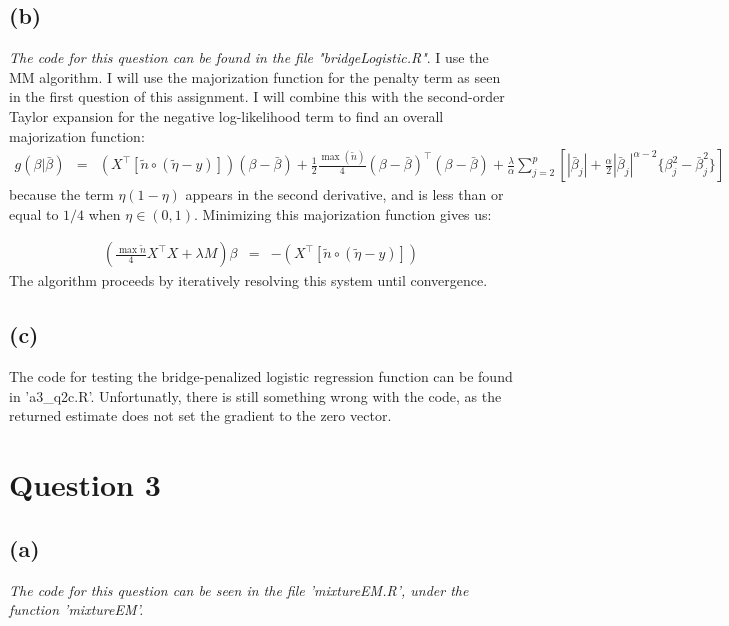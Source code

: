 \documentclass{article}\usepackage[]{graphicx}\usepackage[]{color}
\begin{document}
\subsection*{(b)}
\emph{The code for this question can be found in the file "bridgeLogistic.R"}.  I use the MM algorithm.  I will use the majorization function for the penalty term as seen in the first question of this assignment.  I will combine this with the second-order Taylor expansion for the negative log-likelihood term to find an overall majorization function:
\begin{eqnarray*}
 g(\beta|\bar{\beta}) &=& \left( X^\top[\tilde{n}\circ(\tilde{\eta}-y)] \right)(\beta-\bar{\beta}) + \frac{1}{2}\frac{\max(\tilde{n})}{4}(\beta-\bar{\beta})^\top(\beta-\bar{\beta}) + \frac{\lambda}{\alpha} \sum_{j=2}^p \left[|\bar{\beta}_j| + \frac{\alpha}{2}|\bar{\beta}_j|^{\alpha-2}\{\beta_j^2 - \bar{\beta}_j^2\} \right]
\end{eqnarray*}
because the term $\eta(1-\eta)$ appears in the second derivative, and is less than or equal to $1/4$ when $\eta \in (0,1)$.  Minimizing this majorization function gives us:

\begin{eqnarray*}
 \left(\frac{\max{\tilde{n}}}{4}X^\top X + \lambda M\right)\beta &=& - \left( X^\top[\tilde{n}\circ(\tilde{\eta}-y)] \right)
\end{eqnarray*}
The algorithm proceeds by iteratively resolving this system until convergence.

\subsection*{(c)}
The code for testing the bridge-penalized logistic regression function can be found in 'a3\_q2c.R'.  Unfortunatly, there is still something wrong with the code, as the returned estimate does not set the gradient to the zero vector.

\section*{Question 3}
\subsection*{(a)}
\emph{The code for this question can be seen in the file 'mixtureEM.R', under the function 'mixtureEM'.}
\end{document}

